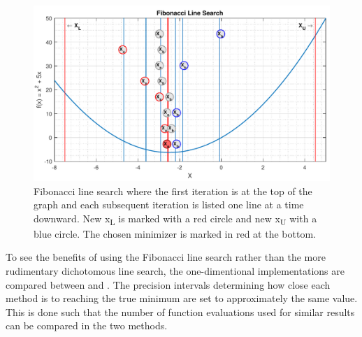 \begin{figure}[H] 
	\centering
	\includegraphics[width=.8\textwidth]{figures/fibonacciLineSearchComprehension}
	\caption{Fibonacci line search where the first iteration is at the top of the graph and each subsequent iteration is listed one line at a time downward. New \si{x_{L}} is marked with a red circle and new \si{x_{U}} with a blue circle. The chosen minimizer is marked in red at the bottom.}
	\label{fibonacciLineSearchComprehensive}
\end{figure}\vspace{-18pt}
%
To see the benefits of using the Fibonacci line search rather than the more rudimentary dichotomous line search, the one-dimentional implementations are compared between  and . The precision intervals determining how close each method is to reaching the true minimum are set to approximately the same value. This is done such that the number of function evaluations used for similar results can be compared in the two methods.

